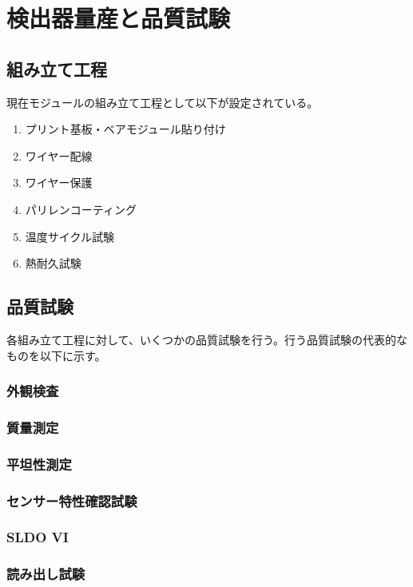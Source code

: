 \chapter{検出器量産と品質試験}

\section{組み立て工程}
現在モジュールの組み立て工程として以下が設定されている。
\begin{enumerate}
  \item プリント基板・ベアモジュール貼り付け
  \item ワイヤー配線
  \item ワイヤー保護
  \item パリレンコーティング
  \item 温度サイクル試験
  \item 熱耐久試験
\end{enumerate}

\section{品質試験}
各組み立て工程に対して、いくつかの品質試験を行う。行う品質試験の代表的なものを以下に示す。

\subsection{外観検査}

\subsection{質量測定}

\subsection{平坦性測定}

\subsection{センサー特性確認試験}

\subsection{SLDO VI}

\subsection{読み出し試験}

